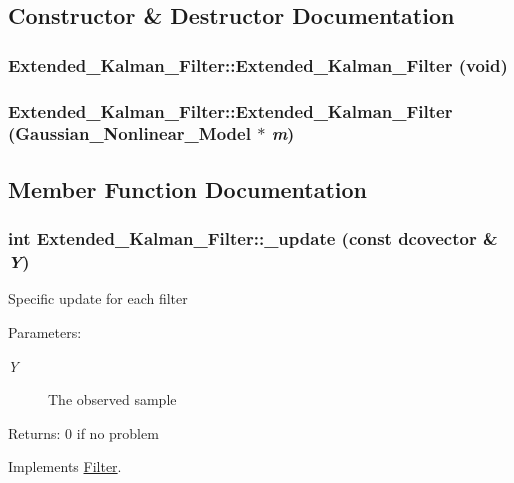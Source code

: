 \subsection{Constructor \& Destructor Documentation}
\hypertarget{class_extended___kalman___filter_faec3e417aa36543328924021abd2bd1}{
\subsubsection[{Extended\_\-Kalman\_\-Filter}]{\setlength{\rightskip}{0pt plus 5cm}Extended\_\-Kalman\_\-Filter::Extended\_\-Kalman\_\-Filter (void)}}
\label{class_extended___kalman___filter_faec3e417aa36543328924021abd2bd1}


\hypertarget{class_extended___kalman___filter_e236e49f87357c4e2958c885fd667092}{
\subsubsection[{Extended\_\-Kalman\_\-Filter}]{\setlength{\rightskip}{0pt plus 5cm}Extended\_\-Kalman\_\-Filter::Extended\_\-Kalman\_\-Filter ({\bf Gaussian\_\-Nonlinear\_\-Model} $\ast$ {\em m})}}
\label{class_extended___kalman___filter_e236e49f87357c4e2958c885fd667092}




\subsection{Member Function Documentation}
\hypertarget{class_extended___kalman___filter_5cfabc6d2256b22baca0a908d29c9c7e}{
\subsubsection[{\_\-update}]{\setlength{\rightskip}{0pt plus 5cm}int Extended\_\-Kalman\_\-Filter::\_\-update (const dcovector \& {\em Y})}}
\label{class_extended___kalman___filter_5cfabc6d2256b22baca0a908d29c9c7e}


Specific update for each filter

\begin{Desc}
\item[Parameters:]
\begin{description}
\item[{\em Y}]The observed sample\end{description}
\end{Desc}
\begin{Desc}
\item[Returns:]0 if no problem \end{Desc}


Implements \hyperlink{class_filter_20ecd17fed3b8f11a76c960fe5e7144b}{Filter}.